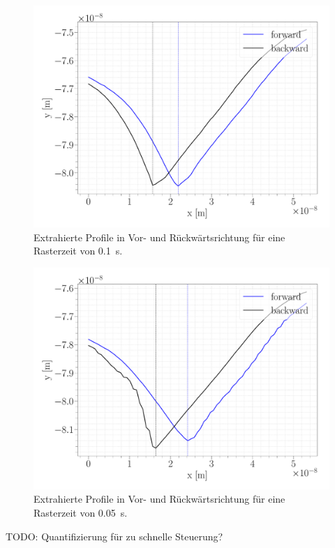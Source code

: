 \begin{figure}[H]
\centering
\includegraphics[width=\textwidth]{../Figures/TIME_01_profile.pdf}
\caption{Extrahierte Profile in Vor- und Rückwärtsrichtung für eine Rasterzeit von \SI{0.1}{s}.}
\label{TIME_01_profile}
\end{figure}

\begin{figure}[H]
\centering
\includegraphics[width=\textwidth]{../Figures/TIME_005_profile.pdf}
\caption{Extrahierte Profile in Vor- und Rückwärtsrichtung für eine Rasterzeit von \SI{0.05}{s}.}
\label{TIME_005_profile}
\end{figure}


TODO: Quantifizierung für zu schnelle Steuerung?


